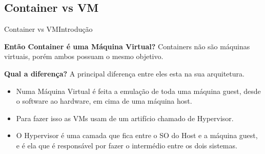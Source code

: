 \documentclass[10pt]{beamer}
\begin{document}
\subsection{Container vs VM}
\begin{frame}{Container vs VM}{Introdução}
    \begin{block}{\textbf{Então Container é uma Máquina Virtual?}}
        \pause
        Containers não são máquinas virtuais, porém ambos possuam o mesmo objetivo.
    \end{block}
    \pause
    \begin{block}{\textbf{Qual a diferença?}}
        A principal diferença entre eles esta na sua arquitetura.
        \begin{itemize}
            \item<4-> Numa Máquina Virtual é feita a emulação de toda uma máquina guest, desde o software ao hardware, em cima de uma máquina host.
            \item<5-> Para fazer isso as VMs usam de um artifício chamado de Hypervisor.
            \item<6-> O Hypervisor é uma camada que fica entre o SO do Host e a máquina guest, e é ela que é responsável por fazer o intermédio entre os dois sistemas.
        \end{itemize}
    \end{block}
\end{frame}
\end{document}
